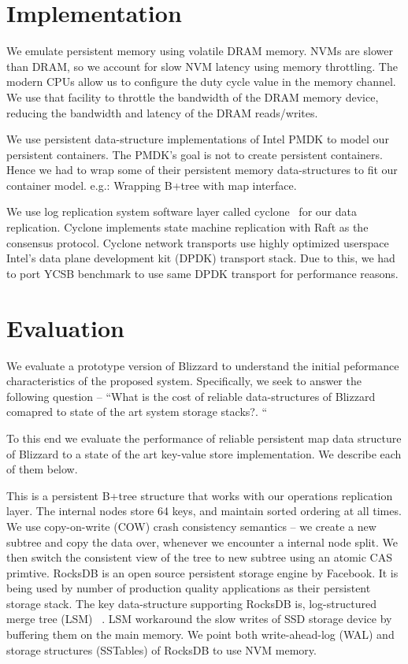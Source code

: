 \section{Implementation}
 We emulate persistent memory using volatile DRAM memory. NVMs are slower than DRAM, so we account for 
slow NVM latency using memory throttling. The modern CPUs allow us to configure the duty cycle value in the memory channel. We use that
facility to throttle the bandwidth of the DRAM memory device, reducing the bandwidth and latency of the DRAM reads/writes. 

We use persistent data-structure implementations of Intel PMDK to model our persistent containers. The PMDK's goal is not to 
create persistent containers. Hence we had to wrap some of their persistent memory data-structures to fit our container model.
e.g.: Wrapping B+tree with map interface.


We use log replication system software layer called cyclone~\cite{cyclone} for our data replication. Cyclone implements 
state machine replication with Raft as the consensus protocol. Cyclone network transports use highly optimized 
userspace Intel's data plane development kit (DPDK) transport stack. Due to this, we had to port YCSB benchmark to
use same DPDK transport for performance reasons.

\section{Evaluation}
We evaluate a prototype version of Blizzard to understand the initial peformance characteristics of the proposed
system. Specifically, we seek to answer the following question -- ``What is the cost of reliable data-structures of
Blizzard comapred to state of the art system storage stacks?. ``

To this end we evaluate the performance of reliable persistent map data structure of Blizzard to a state of the art
key-value store implementation. We describe each of them below.

This is a persistent B+tree structure that works with our operations replication layer. The internal nodes
store 64 keys, and maintain sorted ordering at all times. We use copy-on-write (COW) crash consistency 
semantics -- we create a new subtree and copy the data over, whenever we encounter a internal node split. 
We then switch the consistent view of the tree to new subtree using an atomic CAS primtive. 
RocksDB is an open source persistent storage engine by Facebook. It is being used by number of production quality
applications as their persistent storage stack. The key data-structure supporting RocksDB is, log-structured merge
tree (LSM) ~\cite{lsm}. LSM workaround the slow writes of SSD storage device by buffering them on the main memory.
We point both write-ahead-log (WAL) and storage structures (SSTables) of RocksDB to use NVM memory.

